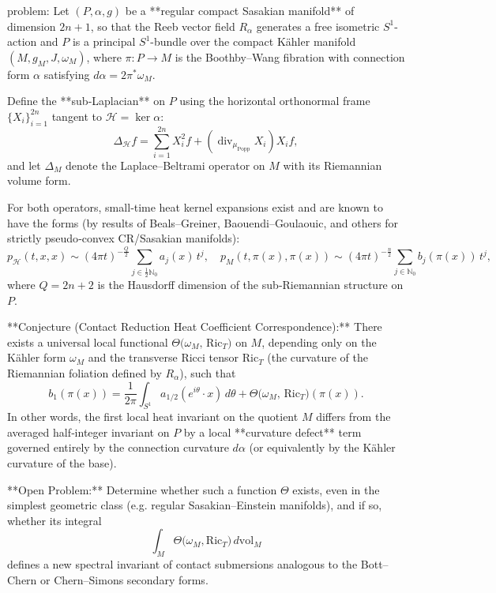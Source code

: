 problem:  
Let \((P, \alpha, g)\) be a **regular compact Sasakian manifold** of dimension \(2n+1\), so that the Reeb vector field \(R_{\alpha}\) generates a free isometric \(S^1\)-action and \(P\) is a principal \(S^1\)-bundle over the compact Kähler manifold \((M,g_M,J,\omega_M)\), where \(\pi: P \to M\) is the Boothby–Wang fibration with connection form \(\alpha\) satisfying \(d\alpha = 2\pi^\ast \omega_M\).  

Define the **sub‑Laplacian** on \(P\) using the horizontal orthonormal frame \(\{X_i\}_{i=1}^{2n}\) tangent to \(\mathcal{H}=\ker\alpha\):
\[
\Delta_{\mathcal{H}} f = \sum_{i=1}^{2n} X_i^2 f + (\operatorname{div}_{\mu_\mathrm{Popp}} X_i) X_i f,
\]
and let \(\Delta_M\) denote the Laplace–Beltrami operator on \(M\) with its Riemannian volume form.  

For both operators, small‑time heat kernel expansions exist and are known to have the forms (by results of Beals–Greiner, Baouendi–Goulaouic, and others for strictly pseudo‑convex CR/Sasakian manifolds):
\[
p_{\mathcal{H}}(t,x,x) \sim (4\pi t)^{-\frac{Q}{2}}\sum_{j\in \frac12\mathbb{N}_0} a_j(x)\,t^{j}, 
\quad 
p_M(t,\pi(x),\pi(x)) \sim (4\pi t)^{-\frac{n}{2}}\sum_{j\in \mathbb{N}_0} b_j(\pi(x))\,t^{j},
\]
where \(Q = 2n+2\) is the Hausdorff dimension of the sub‑Riemannian structure on \(P\).

**Conjecture (Contact Reduction Heat Coefficient Correspondence):**  
There exists a universal local functional \(\Theta\big(\omega_M,\,\mathrm{Ric}_T\big)\) on \(M\), depending only on the Kähler form \(\omega_M\) and the transverse Ricci tensor \(\mathrm{Ric}_T\) (the curvature of the Riemannian foliation defined by \(R_\alpha\)), such that
\[
b_1(\pi(x)) = \frac{1}{2\pi}\int_{S^1}\! a_{1/2}(e^{i\theta}\!\cdot\!x)\, d\theta
+ \Theta\big(\omega_M,\,\mathrm{Ric}_T\big)(\pi(x)).
\]
In other words, the first local heat invariant on the quotient \(M\) differs from the averaged half‑integer invariant on \(P\) by a local **curvature defect** term governed entirely by the connection curvature \(d\alpha\) (or equivalently by the Kähler curvature of the base).

**Open Problem:**  
Determine whether such a function \(\Theta\) exists, even in the simplest geometric class (e.g. regular Sasakian–Einstein manifolds), and if so, whether its integral  
\[
\int_M\Theta\big(\omega_M, \mathrm{Ric}_T\big)\, d\mathrm{vol}_M
\]
defines a new spectral invariant of contact submersions analogous to the Bott–Chern or Chern–Simons secondary forms.

